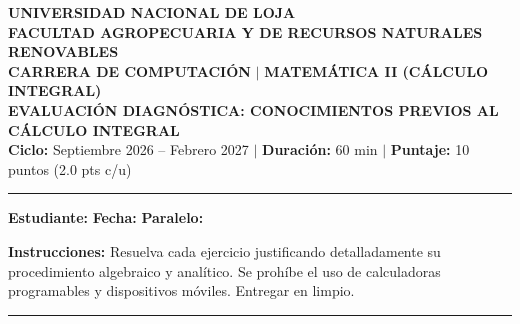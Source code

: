 \documentclass[10pt,a4paper]{article}
\begin{document}
\begin{center}
    {\fontsize{12}{14}\selectfont \textbf{\color{unlbluelight}UNIVERSIDAD NACIONAL DE LOJA}}\\[1.5pt]
    {\fontsize{9.5}{11}\selectfont \textbf{FACULTAD AGROPECUARIA Y DE RECURSOS NATURALES RENOVABLES}}\\[1.5pt]
    {\fontsize{9.5}{11}\selectfont \textbf{CARRERA DE COMPUTACIÓN} $\vert$ \textbf{MATEMÁTICA II (CÁLCULO INTEGRAL)}}\\[2.5pt]
    {\fontsize{10.5}{12}\selectfont \textbf{EVALUACIÓN DIAGNÓSTICA: CONOCIMIENTOS PREVIOS AL CÁLCULO INTEGRAL}}\\[2pt]
    {\footnotesize \textbf{Ciclo:} Septiembre 2026 -- Febrero 2027 \quad $\vert$ \quad \textbf{Duración:} 60 min \quad $\vert$ \quad \textbf{Puntaje:} 10 puntos (2.0 pts c/u)}
\end{center}

\vspace{-6pt}
\noindent\rule{\textwidth}{1.0pt}

\vspace{1pt}
\noindent\textbf{\footnotesize Estudiante:} \hrulefill \quad \textbf{\footnotesize Fecha:} \underline{\hspace{2.5cm}} \quad \textbf{\footnotesize Paralelo:} \underline{\hspace{1.2cm}}

\vspace{3pt}
\noindent\textbf{\footnotesize Instrucciones:} \footnotesize Resuelva cada ejercicio justificando detalladamente su procedimiento algebraico y analítico. Se prohíbe el uso de calculadoras programables y dispositivos móviles. Entregar en limpio.

\vspace{-2pt}
\noindent\rule{\textwidth}{0.5pt}

\vspace{3pt}
\end{document}
